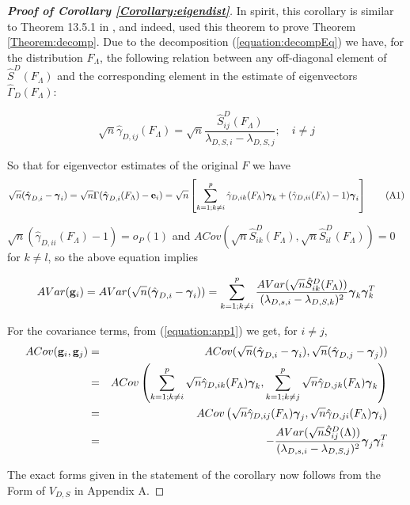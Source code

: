 \documentclass[fleqn,12pt]{article}
\begin{document}
\begin{proof}[\textbf{Proof of Corollary \ref{Corollary:eigendist}}]
In spirit, this corollary is similar to Theorem 13.5.1 in \cite{anderson}, and indeed, \cite{taskinen12} used this theorem to prove Theorem \ref{Theorem:decomp}. Due to the decomposition (\ref{equation:decompEq}) we have, for the distribution $F_\Lambda$, the following relation between any off-diagonal element of $\hat S^D(F_\Lambda)$ and the corresponding element in the estimate of eigenvectors $\hat\Gamma_D (F_\Lambda)$:

$$ \sqrt n \hat\gamma_{D,ij} (F_\Lambda) = \sqrt n \frac{\hat S^D_{ij} (F_\Lambda)}{\lambda_{D,S,i} - \lambda_{D,S,j}}; \quad i \neq j$$

So that for eigenvector estimates of the original $F$ we have
\begin{equation} \label{equation:app1}
\sqrt n (\hat{{\boldsymbol{\gamma}}}_{D,i} - {\boldsymbol{\gamma}}_i) = \sqrt n \Gamma (\hat {{\boldsymbol{\gamma}}}_{D,i}(F_\Lambda) - {\bf{e}}_i ) = \sqrt n \left[ \sum_{k=1; k \neq i}^p \hat \gamma_{D,ik}(F_\Lambda){\boldsymbol{\gamma}}_k + (\hat \gamma_{D,ii}(F_\Lambda) - 1){\boldsymbol{\gamma}}_i \right] \tag{A1}
\end{equation}

$\sqrt n (\hat \gamma_{D,ii}(F_\Lambda) - 1) =  o_P(1)$ and $ACov(\sqrt n \hat S^D_{ik}(F_\Lambda), \sqrt n \hat S^D_{il}(F_\Lambda)) = 0$ for $k \neq l$, so the above equation implies

$$ AVar({\bf{g}}_i) = AVar (\sqrt n (\hat{{\boldsymbol{\gamma}}}_{D,i} - {\boldsymbol{\gamma}}_i)) = \sum_{k=1; k \neq i}^p \frac{AVar(\sqrt n \hat S^D_{ik}(F_\Lambda))}{(\lambda_{D,s,i} - \lambda_{D,S,k})^2} {\boldsymbol{\gamma}}_k {\boldsymbol{\gamma}}_k^T $$

For the covariance terms, from (\ref{equation:app1}) we get, for $i \neq j$,
\begin{eqnarray*}
ACov({\bf{g}}_i, {\bf{g}}_j) &=& ACov (\sqrt n (\hat{{\boldsymbol{\gamma}}}_{D,i} - {\boldsymbol{\gamma}}_i), \sqrt n (\hat{{\boldsymbol{\gamma}}}_{D,j} - {\boldsymbol{\gamma}}_j))\\
&=& ACov \left( \sum_{k=1; k \neq i}^p \sqrt n \hat \gamma_{D,ik}(F_\Lambda){\boldsymbol{\gamma}}_k, \sum_{k=1; k \neq j}^p \sqrt n \hat \gamma_{D,jk}(F_\Lambda){\boldsymbol{\gamma}}_k \right)\\
&=& ACov \left( \sqrt n \hat \gamma_{D,ij}(F_\Lambda){\boldsymbol{\gamma}}_j, \sqrt n \hat \gamma_{D,ji}(F_\Lambda){\boldsymbol{\gamma}}_i \right)\\
&=& - \frac{AVar(\sqrt n \hat S^D_{ij}(\Lambda))}{(\lambda_{D,s,i} - \lambda_{D,S,j})^2} {\boldsymbol{\gamma}}_j {\boldsymbol{\gamma}}_i^T
\end{eqnarray*}

The exact forms given in the statement of the corollary now follows from the  Form of $V_{D,S}$ in Appendix A.


\end{proof}
\end{document}
